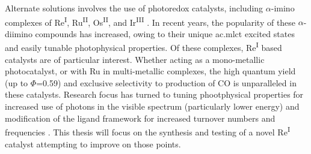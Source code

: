 Alternate solutions involves the use of photoredox catalysts, including $\alpha$-imino complexes of Re\textsuperscript{I}, Ru\textsuperscript{II}, Os\textsuperscript{II}, and Ir\textsuperscript{III}  \autocite{hawecker1983, schneider2011, ishida1987, maidan1986, ishida1990, kitamura1983, tanaka2002, doherty2009, doherty2010, tamaki2013, shunsuke2013, reithmeier2014}. In recent years, the popularity of these $\alpha$-diimino compounds has increased, owing to their unique \gls{ac.mlct} excited states and easily tunable photophysical properties. Of these complexes, Re\textsuperscript{I} based catalysts are of particular interest. Whether acting as a mono-metallic photocatalyst, or with Ru in multi-metallic complexes, the high quantum yield (up to $\Phi$=0.59)\autocite{takeda2008} and exclusive selectivity to production of CO is unparalleled in these catalysts\autocite{grills2010}. Research focus has turned to tuning phootphysical properties for increased use of photons in the visible spectrum (particularly lower energy) and modification of the ligand framework for increased turnover numbers and frequencies \autocite{grills2010, morris2009, kutal1985}. This thesis will focus on the synthesis and testing of a novel Re\textsuperscript{I} catalyst attempting to improve on those points.

